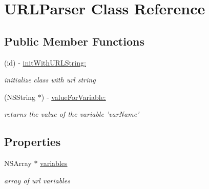 \hypertarget{interface_u_r_l_parser}{\section{U\-R\-L\-Parser Class Reference}
\label{interface_u_r_l_parser}
}
\subsection*{Public Member Functions}
\begin{DoxyCompactItemize}
\item 
\hypertarget{interface_u_r_l_parser_a6e0ce77bf25aa5385addcae4a1017cc5}{(id) -\/ \hyperlink{interface_u_r_l_parser_a6e0ce77bf25aa5385addcae4a1017cc5}{init\-With\-U\-R\-L\-String\-:}}\label{interface_u_r_l_parser_a6e0ce77bf25aa5385addcae4a1017cc5}

\begin{DoxyCompactList}\small\item\em initialize class with url string \end{DoxyCompactList}\item 
(N\-S\-String $\ast$) -\/ \hyperlink{interface_u_r_l_parser_a92bab5ca98064f17778700c746c48306}{value\-For\-Variable\-:}
\begin{DoxyCompactList}\small\item\em returns the value of the variable 'var\-Name' \end{DoxyCompactList}\end{DoxyCompactItemize}
\subsection*{Properties}
\begin{DoxyCompactItemize}
\item 
\hypertarget{interface_u_r_l_parser_aa09551532effe824ea18629d1d4b1a19}{N\-S\-Array $\ast$ \hyperlink{interface_u_r_l_parser_aa09551532effe824ea18629d1d4b1a19}{variables}}\label{interface_u_r_l_parser_aa09551532effe824ea18629d1d4b1a19}

\begin{DoxyCompactList}\small\item\em array of url variables \end{DoxyCompactList}\end{DoxyCompactItemize}


